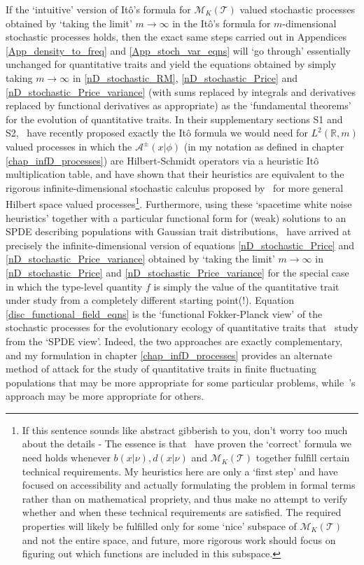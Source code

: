 If the `intuitive' version of It\^{o}'s formula for $\mathcal{M}_K(\mathcal{T})$ valued stochastic processes obtained by `taking the limit' $m \to \infty$ in the It\^{o}'s formula for $m$-dimensional stochastic processes holds, then the exact same steps carried out in Appendices \ref{App_density_to_freq} and \ref{App_stoch_var_eqns} will `go through' essentially unchanged for quantitative traits and yield the equations obtained by simply taking $m \to \infty$ in \eqref{nD_stochastic_RM}, \eqref{nD_stochastic_Price} and \eqref{nD_stochastic_Price_variance} (with sums replaced by integrals and derivatives replaced by functional derivatives as appropriate) as the `fundamental theorems' for the evolution of quantitative traits. In their supplementary sections S1 and S2,~\cite{week_white_2021} have recently proposed exactly the It\^o formula we would need for $L^2(\mathbb{R}, m)$ valued processes in which the $\mathcal{A}^{\pm}(x|\phi)$ (in my notation as defined in chapter \ref{chap_infD_processes}) are Hilbert-Schmidt operators via a heuristic It\^o multiplication table, and have shown that their heuristics are equivalent to the rigorous infinite-dimensional stochastic calculus proposed by~\cite{da_prato_stochastic_2014} for more general Hilbert space valued processes\footnote{If this sentence sounds like abstract gibberish to you, don't worry too much about the details - The essence is that~\cite{week_white_2021} have proven the `correct' formula we need holds whenever $b(x|\nu), d(x|\nu)$ and $\mathcal{M}_K(\mathcal{T})$ together fulfill certain technical requirements. My heuristics here are only a `first step' and have focused on accessibility and actually formulating the problem in formal terms rather than on mathematical propriety, and thus make no attempt to verify whether and when these technical requirements are satisfied. The required properties will likely be fulfilled only for some `nice' subspace of $\mathcal{M}_K(\mathcal{T})$ and not the entire space, and future, more rigorous work should focus on figuring out which functions are included in this subspace.}. Furthermore, using these `spacetime white noise heuristics' together with a particular functional form for (weak) solutions to an SPDE describing populations with Gaussian trait distributions,~\cite{week_white_2021} have arrived at precisely the infinite-dimensional version of equations \eqref{nD_stochastic_Price} and \eqref{nD_stochastic_Price_variance} obtained by `taking the limit' $m \to \infty$ in \eqref{nD_stochastic_Price} and \eqref{nD_stochastic_Price_variance} for the special case in which the type-level quantity $f$ is simply the value of the quantitative trait under study from a completely different starting point(!). Equation \eqref{disc_functional_field_eqns} is the `functional Fokker-Planck view' of the stochastic processes for the evolutionary ecology of quantitative traits that~\cite{week_white_2021} study from the `SPDE view'. Indeed, the two approaches are exactly complementary, and my formulation in chapter \ref{chap_infD_processes} provides an alternate method of attack for the study of quantitative traits in finite fluctuating populations that may be more appropriate for some particular problems, while~\cite{week_white_2021}'s approach may be more appropriate for others.

